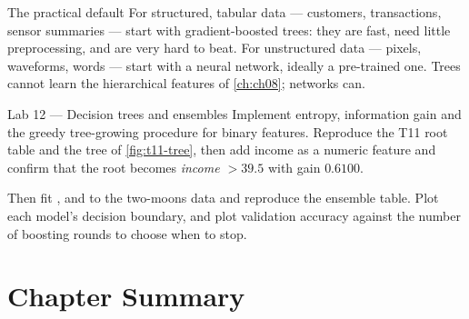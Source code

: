 \begin{keyinsight}{The practical default}
For structured, tabular data --- customers, transactions, sensor summaries ---
start with gradient-boosted trees: they are fast, need little preprocessing, and
are very hard to beat. For unstructured data --- pixels, waveforms, words ---
start with a neural network, ideally a pre-trained one. Trees cannot learn the
hierarchical features of \cref{ch:ch08}; networks can.
\end{keyinsight}

\begin{labbox}{Lab 12 --- Decision trees and ensembles}
Implement entropy, information gain and the greedy tree-growing procedure for
binary features. Reproduce the T11 root table and the tree of \cref{fig:t11-tree},
then add income as a numeric feature and confirm that the root becomes
\emph{income $> 39.5$} with gain $0.6100$.

Then fit ,  and
 to the two-moons data and reproduce the
ensemble table. Plot each model's decision boundary, and plot validation accuracy
against the number of boosting rounds to choose when to stop.
\end{labbox}

\section*{Chapter Summary}

